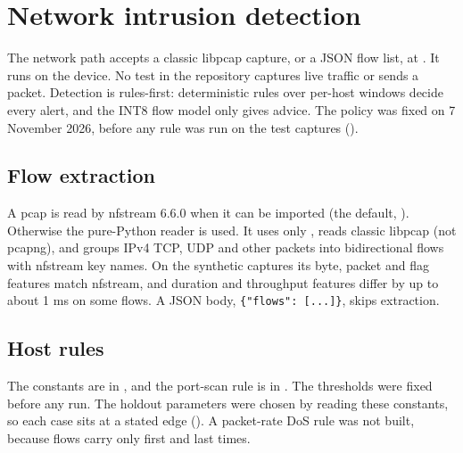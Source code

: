 \section{Network intrusion detection}\label{sec:network}

The network path accepts a classic libpcap capture, or a JSON flow list, at . It runs on the device. No test in the repository captures live traffic or sends a packet. Detection is rules-first: deterministic rules over per-host windows decide every alert, and the INT8 flow model only gives advice. The policy was fixed on 7 November 2026, before any rule was run on the test captures ().

\subsection{Flow extraction}

A pcap is read by nfstream 6.6.0 when it can be imported (the default, ). Otherwise the pure-Python reader \allowbreak{} is used. It uses only , reads classic libpcap (not pcapng), and groups IPv4 TCP, UDP and other packets into bidirectional flows with nfstream key names. On the synthetic captures its byte, packet and flag features match nfstream, and duration and throughput features differ by up to about 1 ms on some flows. A JSON body, \verb|{"flows": [...]}|, skips extraction.

\subsection{Host rules}

The constants are in \allowbreak{}, and the port-scan rule is in \allowbreak{}. The thresholds were fixed before any run. The holdout parameters were chosen by reading these constants, so each case sits at a stated edge (). A packet-rate DoS rule was not built, because flows carry only first and last times.

